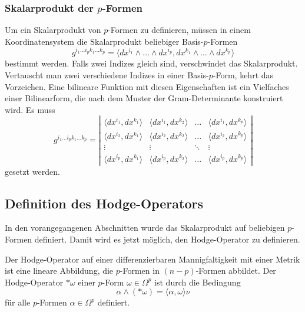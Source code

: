 %
%
\subsubsection{Skalarprodukt der $p$-Formen}
Um ein Skalarprodukt von $p$-Formen zu definieren, müssen in einem
Koordinatensystem die Skalarprodukt beliebiger Basis-$p$-Formen
\[
g^{i_1\dots i_pk_1\dots k_p}
=
\langle
dx^{i_1}\wedge\dots\wedge dx^{i_p}
,
dx^{k_1}\wedge\dots\wedge dx^{k_p}
\rangle
\]
bestimmt werden.
Falls zwei Indizes gleich sind, verschwindet das Skalarprodukt.
Vertauscht man zwei verschiedene Indizes in einer Basis-$p$-Form,
kehrt das Vorzeichen.
Eine bilineare Funktion mit diesen Eigenschaften ist ein Vielfaches
einer Bilinearform, die nach dem Muster der Gram-Determinante 
konstruiert wird.
Es muss
\[
g^{i_1\dots i_pk_1\dots k_p}
=
\left|
\begin{matrix}
\langle dx^{i_1}, dx^{k_1} \rangle
	&\langle dx^{i_1}, dx^{k_2} \rangle
	&\dots
	&\langle dx^{i_1}, dx^{k_p} \rangle
\\
\langle dx^{i_2}, dx^{k_1} \rangle
	&\langle dx^{i_2}, dx^{k_2} \rangle
	&\dots
	&\langle dx^{i_2}, dx^{k_p} \rangle
\\[-2pt]
\vdots
	&\vdots
	&\ddots
	&\vdots
\\
\langle dx^{i_p}, dx^{k_1} \rangle
	&\langle dx^{i_p}, dx^{k_2} \rangle
	&\dots
	&\langle dx^{i_p}, dx^{k_p} \rangle
\end{matrix}
\right|
\]
gesetzt werden.

%
%
\subsection{Definition des Hodge-Operators}
In den vorangegangenen Abschnitten wurde das Skalarprodukt auf
beliebigen $p$-Formen definiert.
Damit wird es jetzt möglich, den Hodge-Operator zu definieren.

\begin{definition}
\label{buch:hodge:koordinatenfrei:def:hodge-operator}
Der Hodge-Operator auf einer differenzierbaren Mannigfaltigkeit
mit einer Metrik ist eine lineare Abbildung, die $p$-Formen in
$(n-p)$-Formen abbildet.
Der Hodge-Operator $\ast\omega$ einer $p$-Form $\omega\in\Omega^p$
ist durch die Bedingung
\begin{equation}
\alpha \wedge (\ast\omega) = \langle \alpha,\omega\rangle \nu
\label{buch:hodge:koordinatenfrei:eqn:definition}
\end{equation}
für alle $p$-Formen $\alpha\in\Omega^p$ definiert.
\end{definition}

